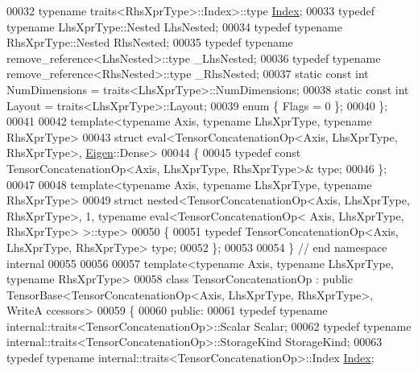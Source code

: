 \begin{DoxyCode}
00032                                       \textcolor{keyword}{typename} traits<RhsXprType>::Index>::type 
      \hyperlink{namespace_eigen_a62e77e0933482dafde8fe197d9a2cfde}{Index};
00033   \textcolor{keyword}{typedef} \textcolor{keyword}{typename} LhsXprType::Nested LhsNested;
00034   \textcolor{keyword}{typedef} \textcolor{keyword}{typename} RhsXprType::Nested RhsNested;
00035   \textcolor{keyword}{typedef} \textcolor{keyword}{typename} remove\_reference<LhsNested>::type \_LhsNested;
00036   \textcolor{keyword}{typedef} \textcolor{keyword}{typename} remove\_reference<RhsNested>::type \_RhsNested;
00037   \textcolor{keyword}{static} \textcolor{keyword}{const} \textcolor{keywordtype}{int} NumDimensions = traits<LhsXprType>::NumDimensions;
00038   \textcolor{keyword}{static} \textcolor{keyword}{const} \textcolor{keywordtype}{int} Layout = traits<LhsXprType>::Layout;
00039   \textcolor{keyword}{enum} \{ Flags = 0 \};
00040 \};
00041 
00042 \textcolor{keyword}{template}<\textcolor{keyword}{typename} Axis, \textcolor{keyword}{typename} LhsXprType, \textcolor{keyword}{typename} RhsXprType>
00043 \textcolor{keyword}{struct }eval<TensorConcatenationOp<Axis, LhsXprType, RhsXprType>, \hyperlink{namespace_eigen}{Eigen}::Dense>
00044 \{
00045   \textcolor{keyword}{typedef} \textcolor{keyword}{const} TensorConcatenationOp<Axis, LhsXprType, RhsXprType>& type;
00046 \};
00047 
00048 \textcolor{keyword}{template}<\textcolor{keyword}{typename} Axis, \textcolor{keyword}{typename} LhsXprType, \textcolor{keyword}{typename} RhsXprType>
00049 \textcolor{keyword}{struct }nested<TensorConcatenationOp<Axis, LhsXprType, RhsXprType>, 1, typename eval<TensorConcatenationOp<
      Axis, LhsXprType, RhsXprType> >::type>
00050 \{
00051   \textcolor{keyword}{typedef} TensorConcatenationOp<Axis, LhsXprType, RhsXprType> type;
00052 \};
00053 
00054 \}  \textcolor{comment}{// end namespace internal}
00055 
00056 
00057 \textcolor{keyword}{template}<\textcolor{keyword}{typename} Axis, \textcolor{keyword}{typename} LhsXprType, \textcolor{keyword}{typename} RhsXprType>
00058 \textcolor{keyword}{class }TensorConcatenationOp : \textcolor{keyword}{public} TensorBase<TensorConcatenationOp<Axis, LhsXprType, RhsXprType>, WriteA
      ccessors>
00059 \{
00060   \textcolor{keyword}{public}:
00061     \textcolor{keyword}{typedef} \textcolor{keyword}{typename} internal::traits<TensorConcatenationOp>::Scalar Scalar;
00062     \textcolor{keyword}{typedef} \textcolor{keyword}{typename} internal::traits<TensorConcatenationOp>::StorageKind StorageKind;
00063     \textcolor{keyword}{typedef} \textcolor{keyword}{typename} internal::traits<TensorConcatenationOp>::Index \hyperlink{namespace_eigen_a62e77e0933482dafde8fe197d9a2cfde}{Index};

\end{DoxyCode}
